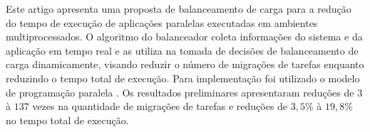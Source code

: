 \setlength{\absparsep}{18pt} %
\begin{resumo}
Este artigo apresenta uma proposta de balanceamento de carga para a redução do tempo de execução de aplicações paralelas executadas em ambientes multiprocessados.
O algoritmo do balanceador coleta informações do sistema e da aplicação em tempo real e as utiliza na tomada de decisões de balanceamento de carga dinamicamente, visando reduzir o número de migrações de tarefas enquanto reduzindo o tempo total de execução.  
Para implementação foi utilizado o modelo de programação paralela \charm. 
Os resultados preliminares apresentaram reduções de $3$ à $137$ vezes na quantidade de migrações de tarefas e reduções de $3,5$\% à $19,8$\% no tempo total de execução.	
\begin{comment}
Este trabalho trata de um tema bastante discutido atualmente, a computação paralela e heterogênea. Visa realizar a comparação de desempenho e eficiência energética de componentes que se enquadram nesta categoria. Para isso, serão comparados um coprocessador Intel Xeon Phi e uma GPGPU NVIDIA. Antes de compará-los, foi necessário um estudo das arquiteturas das GPUs da NVIDIA e do coprocessador Intel Xeon Phi (Intel MIC), bem como de algumas APIs e plataformas que possibilitam a implementação nestes componentes. A comparação foi realizada utilizando um \textit{benchmark}, que igualmente foi estudado. Como resultado, percebeu-se o quão eficientes ambos os componentes podem ser, no caso do Xeon Phi, que no \textit{benchmark} \textit{MaxFlops}, alcançou 5,06 TFlops para valores de precisão simples com uma eficiência energética de 17,27 GFlops/W e, na GPGPU NVIDIA, que no \textit{benchmark} GEMM, atingiu 3,03 TFlops para valores de precisão simples e uma eficiência energética de 13,18 GFlops/W. 


- O resumo deve responder 4 perguntas:

	a) qual o tema do trabalho; 

	b) qual o objetivo; 

	c) qual a metodologia empregada; e 

	d) qual o resultado/conclusão do trabalho.




\textbf{Palavras-chave}: Computação Paralela, Computação Heterogênea, Computação de Alto Desempenho, CUDA, OpenCL, OpenMP, SHOC \textit{Benchmark Suite}.
\end{comment}
\end{resumo}